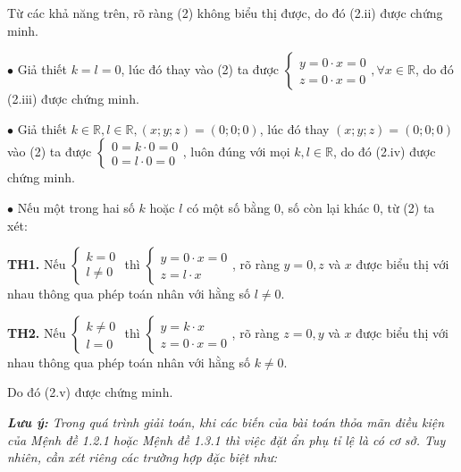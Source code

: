 \documentclass[12pt]{report}
\begin{document}
\vspace{0.2cm}
\noindent Từ các khả năng trên, rõ ràng (2) không biểu thị được, do đó (2.ii) được chứng minh.

\vspace{0.3cm}
\noindent $\bullet$ Giả thiết $k = l = 0$, lúc đó thay vào (2) ta được $\begin{cases} y = 0 \cdot x = 0 \\ z = 0 \cdot x = 0 \end{cases}, \forall x \in \mathbb{R}$, do đó (2.iii) được chứng minh.

\vspace{0.3cm}
\noindent $\bullet$ Giả thiết $k \in \mathbb{R}, l \in \mathbb{R}, (x; y; z) = (0; 0; 0)$, lúc đó thay $(x; y; z) = (0; 0; 0)$ vào (2) ta được $\begin{cases} 0 = k \cdot 0 = 0 \\ 0 = l \cdot 0 = 0 \end{cases}$, luôn đúng với mọi $k, l \in \mathbb{R}$, do đó (2.iv) được chứng minh.

\vspace{0.3cm}
\noindent $\bullet$ Nếu một trong hai số $k$ hoặc $l$ có một số bằng 0, số còn lại khác 0, từ (2) ta xét:

\vspace{0.2cm}
\noindent \textbf{TH1.} Nếu $\begin{cases} k = 0 \\ l \neq 0 \end{cases}$ thì $\begin{cases} y = 0 \cdot x = 0 \\ z = l \cdot x \end{cases}$, rõ ràng $y = 0, z$ và $x$ được biểu thị với nhau thông qua phép toán nhân với hằng số $l \neq 0$.

\vspace{0.2cm}
\noindent \textbf{TH2.} Nếu $\begin{cases} k \neq 0 \\ l = 0 \end{cases}$ thì $\begin{cases} y = k \cdot x \\ z = 0 \cdot x = 0 \end{cases}$, rõ ràng $z = 0, y$ và $x$ được biểu thị với nhau thông qua phép toán nhân với hằng số $k \neq 0$.

\vspace{0.2cm}
\noindent Do đó (2.v) được chứng minh.

\vspace{0.4cm}
\noindent \textit{\textbf{Lưu ý:} Trong quá trình giải toán, khi các biến của bài toán thỏa mãn điều kiện của Mệnh đề 1.2.1 hoặc Mệnh đề 1.3.1 thì việc đặt ẩn phụ tỉ lệ là có cơ sở. Tuy nhiên, cần xét riêng các trường hợp đặc biệt như:}
\end{document}
